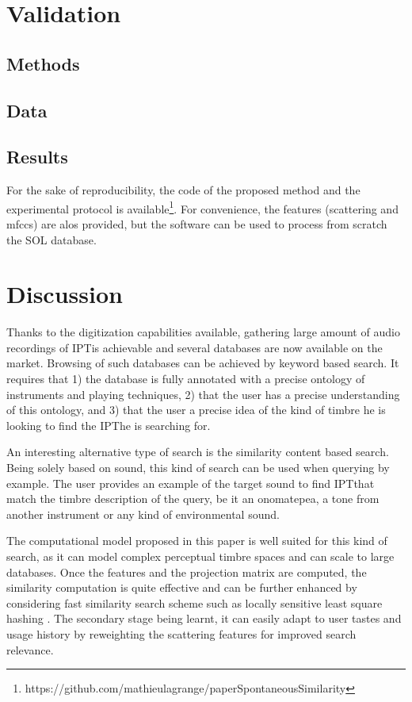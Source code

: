 \documentclass{article}
\newcommand{\ipt}{IPT}
\begin{document}
\section{Validation}\label{sec:validation}

\subsection{Methods}

\subsection{Data}

\subsection{Results}

For the sake of reproducibility, the code of the proposed method and the experimental protocol is available\footnote{https://github.com/mathieulagrange/paperSpontaneousSimilarity}. For convenience, the features (scattering and mfccs) are alos provided, but the software can be used to process from scratch the SOL database.

\section{Discussion}\label{sec:discussion}

Thanks to the digitization capabilities available, gathering large amount of audio recordings of \ipt is achievable and several databases are now available on the market. Browsing of such databases can be achieved by keyword based search. It requires that 1) the database is fully annotated with a precise ontology of instruments and playing techniques, 2) that the user has a precise understanding of this ontology, and 3) that the user a precise idea of the kind of timbre he is looking to find the \ipt he is searching for.

An interesting alternative type of search is the similarity content based search. Being solely based on sound, this kind of search can be used when querying by example. The user provides an example of the target sound to find \ipt that match the timbre description of the query, be it an onomatepea, a tone from another instrument or any kind of environmental sound.

The computational model proposed in this paper is well suited for this kind of search, as it can model complex perceptual timbre spaces and can scale to large databases. Once the features and the projection matrix are computed, the similarity computation is quite effective and can be further enhanced by considering fast similarity search scheme such as locally sensitive least square hashing \cite{pauleve2010locality}. The secondary stage being learnt, it can easily adapt to user tastes and usage history by reweighting the scattering features for improved search relevance.
\end{document}
